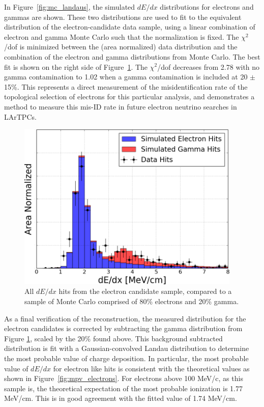 In Figure~\ref{fig:mc_landaus}, the simulated $dE/dx$ distributions for electrons and gammas are shown.  These two distributions are used to fit to the equivalent distribution of the electron-candidate data sample, using a linear combination of electron and gamma Monte Carlo such that the normalization is fixed.  The $\chi^2$/dof is minimized between the (area normalized) data distribution and the combination of the electron and gamma distributions from Monte Carlo.  The best fit is shown on the right side of Figure~\ref{fig:electron_landau}.  The $\chi^2$/dof decreases from 2.78 with no gamma contamination to 1.02 when a gamma contamination is included at 20 $\pm$ 15\%.  This represents a direct measurement of the misidentification rate of the topological selection of electrons for this particular analysis, and demonstrates a method to measure this mis-ID rate in future electron neutrino searches in LArTPCs.

\begin{figure}[htb]
  \centering
  \includegraphics[width=0.95\textwidth]{emshower_figures/fitted_electron_distribution_trimmed.png}
  \caption{All $dE/dx$ hits from the electron candidate sample, compared to a sample of Monte Carlo comprised of 80\% electrons and 20\% gamma.}
  \label{fig:electron_landau}
\end{figure} 


As a final verification of the reconstruction, the measured distribution for the electron candidates is corrected by subtracting the gamma distribution from Figure \ref{fig:electron_landau}, scaled by the 20\% found above.  This background subtracted distribution is fit with a Gaussian-convolved Landau distribution to determine the most probable value of charge deposition.  In particular, the most probable value of $dE/dx$ for electron like hits is consistent with the theoretical values as shown in Figure~\ref{fig:mpv_electrons}. For electrons above 100 MeV/c, as this sample is, the theoretical expectation of the most probable ionization is 1.77 MeV/cm.  This is in good agreement with the fitted value of 1.74 MeV/cm.

